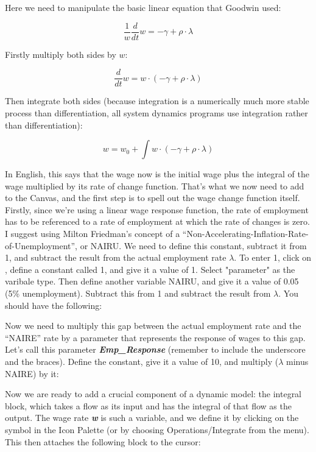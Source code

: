 Here we need to manipulate the basic linear equation that Goodwin used:

\begin{displaymath}
\frac1w\frac d{dt}w = -\gamma+\rho\cdot\lambda
\end{displaymath}

Firstly multiply both sides by $w$:

\begin{displaymath}
\frac d{dt}w = w\cdot(-\gamma+\rho\cdot\lambda)
\end{displaymath}

Then integrate both sides (because integration is a numerically much
more stable process than differentiation, all system dynamics programs
use integration rather than differentiation): 

\begin{displaymath}
w=w_0+\int w\cdot(-\gamma+\rho\cdot\lambda)
\end{displaymath}

In English, this says that the wage now is the initial wage plus the
integral of the wage multiplied by its rate of change function. That's
what we now need to add to the Canvas, and the first step is to spell
out the wage change function itself. Firstly, since we're using a
linear wage response function, the rate of employment has to be
referenced to a rate of employment at which the rate of changes is
zero.  I suggest using Milton Friedman's concept of a
``Non-Accelerating-Inflation-Rate-of-Unemployment'', or NAIRU. We need
to define this constant, subtract it from 1, and subtract the result
from the actual employment rate $\lambda$. To enter 1, click on , define a
constant called 1, and give it a value of 1. Select "parameter"
as the varibale type. Then define another variable
NAIRU, and give it a value of 0.05 (5\% unemployment). Subtract this
from 1 and subtract the result from $\lambda$. You should have the following:


Now we need to multiply this gap between the actual employment rate
and the ``NAIRE'' rate by a parameter that represents the response of
wages to this gap. Let's call this parameter {\bf\em Emp\_{Response}} (remember to include the underscore and the braces). Define the constant, give it a value of 10, and multiply ($\lambda$ minus NAIRE) by it:


Now we are ready to add a crucial component of a dynamic model: the
integral block, which takes a flow as its input and has the integral
of that flow as the output. The wage rate {\bf\em w} is such a variable, and we
define it by clicking on the  symbol in the Icon Palette (or by
choosing Operations/Integrate from the menu). This then attaches the
following block to the cursor: 

